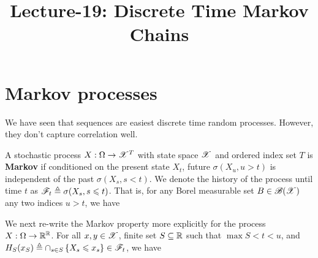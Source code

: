 \documentclass[letterpaper,10pt,english]{article}
\title{ Lecture-19: Discrete Time Markov Chains}
\author{}
\begin{document}
\maketitle

\section{Markov processes}
We have seen that \iid sequences are easiest discrete time random processes. 
However, they don't capture correlation well. 
\begin{defn}
A stochastic process $X:\Omega\to\mathscr{X}^T$ with state space $\mathscr{X}$ and ordered index set $T$ is \textbf{Markov} if conditioned on the present state $X_t$, future $\sigma(X_u, u > t)$ is independent of the past $\sigma(X_s, s< t)$. 
We denote the history of the process until time $t$ as $\mathscr{F}_t \triangleq \sigma(X_s, s \leqslant t)$. 
That is, for any Borel measurable set $B \in \mathscr{B}(\mathscr{X})$ %
any two indices $u > t$, we have  %
\end{defn}
\begin{rem}
We next re-write the Markov property more explicitly for the process $X:\Omega\to\mathbb{R}^{\mathbb{R}}$. 
For all $x, y \in \mathscr{X}$, finite set $S \subseteq \mathbb{R}$ such that $\max S < t < u$, and $H_S(x_S) \triangleq \cap_{s \in S}\left\{X_s \leqslant x_s\right\} \in \mathscr{F}_t$, we have 
\end{rem}
\end{document}
